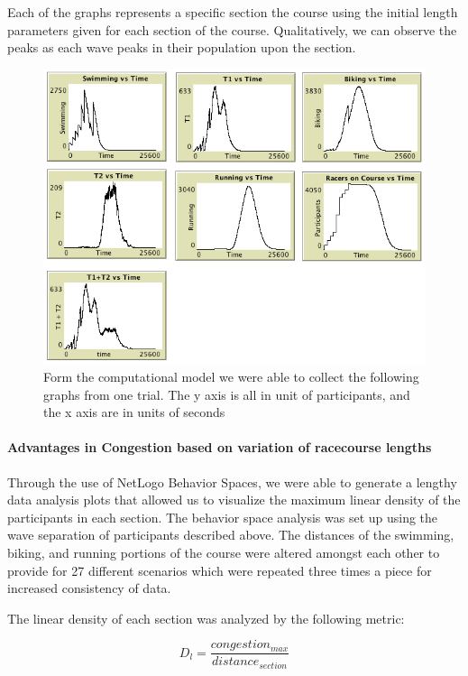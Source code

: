 \documentclass[12pt]{article}
\begin{document}
Each of the graphs represents a specific section the course using the initial length parameters given for each section of the course. Qualitatively, we can observe the peaks as each wave peaks in their population upon the section.

\begin{figure}[H]
    \label{fig:optimalCharts}
  \centering
  \includegraphics[width=1\textwidth]{optimalGraphs.png}
  \caption{Form the computational model we were able to collect the following graphs from one trial. The y axis is all in unit of participants, and the x axis are in units of seconds}
\end{figure}

\paragraph{Advantages in Congestion based on variation of racecourse lengths}
Through the use of NetLogo Behavior Spaces, we were able to generate a lengthy data analysis plots that allowed us to visualize the maximum linear density of the participants in each section. The behavior space analysis was set up using the wave separation of participants described above. The distances of the swimming, biking, and running portions of the course were altered amongst each other to provide for 27 different scenarios which were repeated three times a piece for increased consistency of data. 

The linear density of each section was analyzed by the following metric:

$$D_l = \frac{congestion_{max}}{distance_{section}}$$
\end{document}
